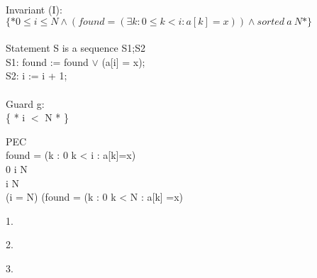 \documentclass[fontsize=9p]{article}
\begin{document}
\noindent Invariant (I): \\
$\{* 0 \le i \le N \wedge (found = (\exists k : 0\le k < i : a[k] = x)) \wedge sorted \:a \:N *\}$ \\ \\

\noindent Statement S is a sequence S1;S2 \\
S1: found := found $\vee$ (a[i] = x); \\
S2: i := i + 1;  \\\\

\noindent Guard g:\\
\{ * i $<$ N * \} \\

\noindent \begin{PROOF}{ PEC} \\
  {found = (\exists k : 0 \le k < i : a[k]=x)} \\
 {0 \le i \le N} \\
 {i \ge N} \\
 {(i = N) \wedge (found = (\exists k : 0 \le k < N : a[k] =x) } \\
\begin{BODY}
\item[1.]  \\
\item[2.]  \\
\item[3.]  \\
\end{BODY}
\end{PROOF}
\vspace{5mm}
\end{document}
